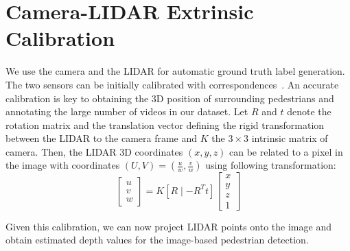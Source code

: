 
\section{Camera-LIDAR Extrinsic Calibration}
We use the camera and the LIDAR for automatic ground truth label generation. The two sensors can be initially calibrated with correspondences~\cite{Autoware,calibration}. An accurate calibration is key to obtaining the 3D position of surrounding pedestrians and annotating the large number of videos in our dataset. Let $R$ and $t$ denote the rotation matrix and the translation vector defining the rigid transformation between the LIDAR to the camera frame and $K$ the $3 \times 3$ intrinsic matrix of camera. Then, the LIDAR 3D coordinates $(x, y, z)$ can be related to a pixel in the image with coordinates $(U,V) = (\frac{u}{w}, \frac{v}{w})$ using following transformation:
\begin{equation}\label{eq:Rt}
    \begin{bmatrix}u \\ v \\ w\end{bmatrix} = K[R \mid -R^{T}t] \begin{bmatrix} x \\ y \\ z \\ 1\end{bmatrix}
\end{equation}

Given this calibration, we can now project LIDAR points onto the image and obtain estimated depth values for the image-based pedestrian detection. 


